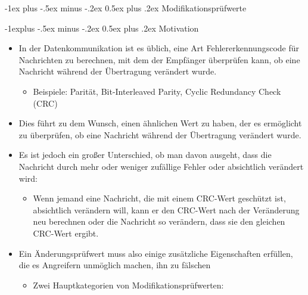 \documentclass[a4paper]{article}
\makeatletter
\renewcommand{\section}{\@startsection{section}{1}{0mm}%
 {-1ex plus -.5ex minus -.2ex}%
 {0.5ex plus .2ex}%
 {\normalfont\large\bfseries}}
\renewcommand{\subsection}{\@startsection{subsection}{2}{0mm}%
 {-1explus -.5ex minus -.2ex}%
 {0.5ex plus .2ex}%
 {\normalfont\normalsize\bfseries}}
\makeatother
\begin{document}
\begin{multicols}{3}
    \section{Modifikationsprüfwerte}


    \subsection{Motivation}

    \begin{itemize}
        \item
              In der Datenkommunikation ist es üblich, eine Art Fehlererkennungscode
              für Nachrichten zu berechnen, mit dem der Empfänger überprüfen kann,
              ob eine Nachricht während der Übertragung verändert wurde.

              \begin{itemize}
                  \item
                        Beispiele: Parität, Bit-Interleaved Parity, Cyclic Redundancy Check
                        (CRC)
              \end{itemize}
        \item
              Dies führt zu dem Wunsch, einen ähnlichen Wert zu haben, der es
              ermöglicht zu überprüfen, ob eine Nachricht während der Übertragung
              verändert wurde.
        \item
              Es ist jedoch ein großer Unterschied, ob man davon ausgeht, dass die
              Nachricht durch mehr oder weniger zufällige Fehler oder absichtlich
              verändert wird:

              \begin{itemize}
                  \item
                        Wenn jemand eine Nachricht, die mit einem CRC-Wert geschützt ist,
                        absichtlich verändern will, kann er den CRC-Wert nach der
                        Veränderung neu berechnen oder die Nachricht so verändern, dass sie
                        den gleichen CRC-Wert ergibt.
              \end{itemize}
        \item
              Ein Änderungsprüfwert muss also einige zusätzliche Eigenschaften
              erfüllen, die es Angreifern unmöglich machen, ihn zu fälschen

              \begin{itemize}
                  \item
                        Zwei Hauptkategorien von Modifikationsprüfwerten:


\end{itemize}
\end{itemize}
\end{multicols}
\end{document}
